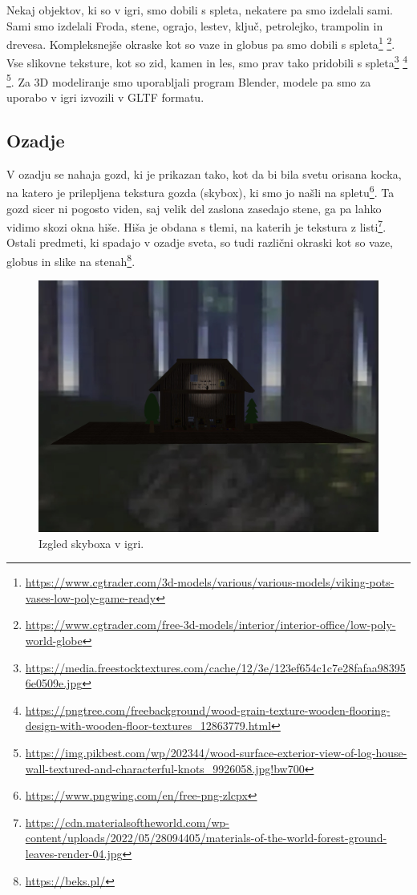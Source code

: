 \documentclass[a4paper,12pt]{article}
\begin{document}
Nekaj objektov, ki so v igri, smo dobili s spleta, nekatere pa smo izdelali sami. Sami smo izdelali Froda, stene, ograjo, lestev, ključ, petrolejko, trampolin in drevesa. Kompleksnejše okraske kot so vaze in globus pa smo dobili s spleta\footnote{\url{https://www.cgtrader.com/3d-models/various/various-models/viking-pots-vases-low-poly-game-ready}} \footnote{\url{https://www.cgtrader.com/free-3d-models/interior/interior-office/low-poly-world-globe}}. Vse slikovne teksture, kot so zid, kamen in les, smo prav tako pridobili s spleta\footnote{\url{https://media.freestocktextures.com/cache/12/3e/123ef654c1c7e28fafaa983956e0509e.jpg}} \footnote{\url{https://pngtree.com/freebackground/wood-grain-texture-wooden-flooring-design-with-wooden-floor-textures_12863779.html}} \footnote{\url{https://img.pikbest.com/wp/202344/wood-surface-exterior-view-of-log-house-wall-textured-and-characterful-knots_9926058.jpg!bw700}}. Za 3D modeliranje smo uporabljali program Blender, modele pa smo za uporabo v igri izvozili v GLTF formatu.

\subsection{Ozadje}
V ozadju se nahaja gozd, ki je prikazan tako, kot da bi bila svetu orisana kocka, na katero je prilepljena tekstura gozda (skybox), ki smo jo našli na spletu\footnote{\url{https://www.pngwing.com/en/free-png-zlcpx}}. Ta gozd sicer ni pogosto viden, saj velik del zaslona zasedajo stene, ga pa lahko vidimo skozi okna hiše. Hiša je obdana s tlemi, na katerih je tekstura z listi\footnote{\url{https://cdn.materialsoftheworld.com/wp-content/uploads/2022/05/28094405/materials-of-the-world-forest-ground-leaves-render-04.jpg}}. Ostali predmeti, ki spadajo v ozadje sveta, so tudi različni okraski kot so vaze, globus in slike na stenah\footnote{\url{https://beks.pl/}}.

\begin{figure}[!htb]
    \begin{center}
        \includegraphics[width=0.8\columnwidth]{skybox.jpg}
        \caption{Izgled skyboxa v igri.}
    \end{center}
\end{figure}
\end{document}
